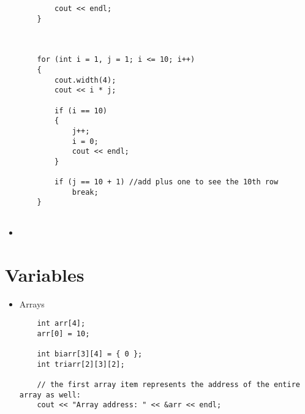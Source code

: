 \documentclass{article}
\begin{document}
\begin{itemize}
\begin{lstlisting}
		cout << endl;
	}

	

	for (int i = 1, j = 1; i <= 10; i++)
	{
		cout.width(4);
		cout << i * j;

		if (i == 10)
		{
			j++;
			i = 0;
			cout << endl;
		}

		if (j == 10 + 1) //add plus one to see the 10th row
			break;
	}


\end{lstlisting}




\item{}

\begin{lstlisting}

\end{lstlisting}

\end{itemize}






\section{Variables}

\begin{itemize}

\item{Arrays}
\begin{lstlisting}
	int arr[4];
	arr[0] = 10;

	int biarr[3][4] = { 0 };
	int triarr[2][3][2];

	// the first array item represents the address of the entire array as well:
	cout << "Array address: " << &arr << endl;
	
	
\end{lstlisting}

\end{itemize}
\end{document}
